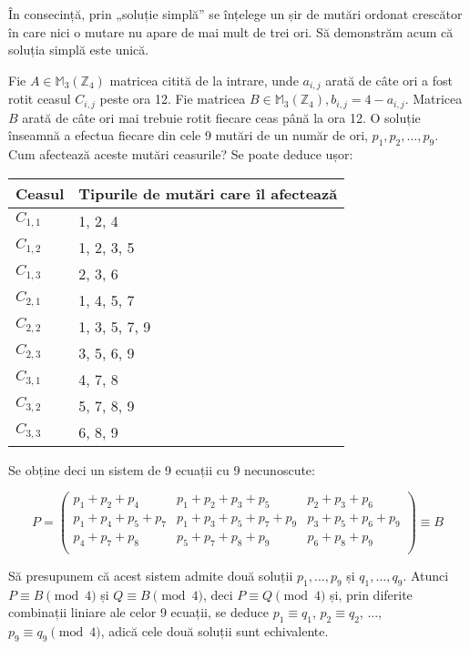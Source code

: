 În consecință, prin „soluție simplă” se înțelege un șir de mutări ordonat
crescător în care nici o mutare nu apare de mai mult de trei ori. Să
demonstrăm acum că soluția simplă este unică.

Fie $A \in \mathbb{M}_3(\mathbb{Z}_4)$ matricea citită de la intrare, unde
$a_{i,j}$ arată de câte ori a fost rotit ceasul $C_{i,j}$ peste ora 12. Fie
matricea $B \in \mathbb{M}_3(\mathbb{Z}_4), b_{i,j}=4 - a_{i,j}$. Matricea $B$
arată de câte ori mai trebuie rotit fiecare ceas până la ora 12. O soluție
înseamnă a efectua fiecare din cele 9 mutări de un număr de ori, $p_1, p_2,
\dots, p_9$. Cum afectează aceste mutări ceasurile? Se poate deduce ușor:

\begin{tabular}{| l | l |}
  \hline
  Ceasul & Tipurile de mutări care îl afectează \\ \hline
  $C_{1,1}$ & 1, 2, 4 \\
  $C_{1,2}$ & 1, 2, 3, 5 \\
  $C_{1,3}$ & 2, 3, 6 \\
  $C_{2,1}$ & 1, 4, 5, 7 \\
  $C_{2,2}$ & 1, 3, 5, 7, 9 \\
  $C_{2,3}$ & 3, 5, 6, 9 \\
  $C_{3,1}$ & 4, 7, 8 \\
  $C_{3,2}$ & 5, 7, 8, 9 \\
  $C_{3,3}$ & 6, 8, 9 \\
  \hline
\end{tabular}

Se obține deci un sistem de 9 ecuații cu 9 necunoscute:

\begin{equation}
  P = 
  \begin{pmatrix}
    p_1 + p_2 + p_4 & p_1 + p_2 + p_3 + p_5 & p_2 + p_3 + p_6 \\
    p_1 + p_4 + p_5 + p_7 & p_1 + p_3 + p_5 + p_7 + p_9 & p_3 + p_5 + p_6 + p_9 \\
    p_4 + p_7 + p_8 & p_5 + p_7 + p_8 + p_9 & p_6 + p_8 + p_9 \\
  \end{pmatrix}
  \equiv B
\end{equation}

Să presupunem că acest sistem admite două soluții $p_1, \dots, p_9$ și $q_1,
\dots, q_9$. Atunci $P \equiv B \pmod{4}$ și $Q \equiv B \pmod{4}$, deci $P
\equiv Q \pmod{4}$ și, prin diferite combinații liniare ale celor 9 ecuații,
se deduce $p_1 \equiv q_1$, $p_2 \equiv q_2$, ..., $p_9 \equiv q_9 \pmod{4}$,
adică cele două soluții sunt echivalente.

